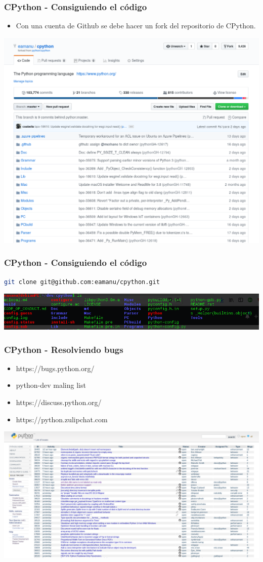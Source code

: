 \documentclass[spanish]{beamer}
\begin{document}
\begin{frame}
	\frametitle{CPython - Consiguiendo el código}
	\begin{itemize}
		\item Con una cuenta de Github se debe hacer un fork del repositorio de CPython.
	\end{itemize}
	\center
	\includegraphics[width=0.8\linewidth]{fork.png}
\end{frame}

\begin{frame}[fragile]
	\frametitle{CPython - Consiguiendo el código}
	\begin{lstlisting}[language=bash]
git clone git@github.com:eamanu/cpython.git
	\end{lstlisting}

	\center
	\includegraphics[width=0.8\linewidth]{clone.png}
\end{frame}

\begin{frame}
	\frametitle{CPython -  Resolviendo bugs}
	\begin{itemize}
		\item https://bugs.python.org/
		\item python-dev maling list
		\item https://discuss.python.org/
		\item https://python.zulipchat.com
	\end{itemize}

	\center
	\includegraphics[width=1\linewidth]{bpo.png}
\end{frame}
\end{document}
